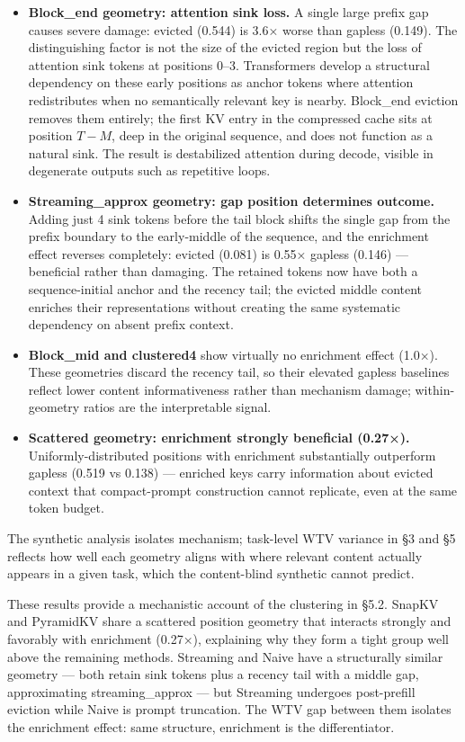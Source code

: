 \documentclass[10pt,letterpaper]{article}
\providecommand{\tightlist}{%
  \setlength{\itemsep}{0pt}\setlength{\parskip}{0pt}}
\begin{document}
\begin{itemize}
\tightlist
\item
  \textbf{Block\_end geometry: attention sink loss.} A single large
  prefix gap causes severe damage: evicted (0.544) is 3.6× worse than
  gapless (0.149). The distinguishing factor is not the size of the
  evicted region but the loss of attention sink tokens at positions 0--3.
  Transformers develop a structural dependency on these early positions
  as anchor tokens where attention redistributes when no semantically
  relevant key is nearby. Block\_end eviction removes them entirely; the
  first KV entry in the compressed cache sits at position $T{-}M$, deep
  in the original sequence, and does not function as a natural sink. The
  result is destabilized attention during decode, visible in degenerate
  outputs such as repetitive loops.
\item
  \textbf{Streaming\_approx geometry: gap position determines outcome.}
  Adding just 4 sink tokens before the tail block shifts the single gap
  from the prefix boundary to the early-middle of the sequence, and the
  enrichment effect reverses completely: evicted (0.081) is 0.55× gapless
  (0.146) --- beneficial rather than damaging. The retained tokens now
  have both a sequence-initial anchor and the recency tail; the evicted
  middle content enriches their representations without creating the same
  systematic dependency on absent prefix context.
\item
  \textbf{Block\_mid and clustered4} show virtually no enrichment
  effect (1.0×). These geometries discard the recency tail, so their
  elevated gapless baselines reflect lower content informativeness rather
  than mechanism damage; within-geometry ratios are the interpretable
  signal.
\item
  \textbf{Scattered geometry: enrichment strongly beneficial (0.27×).}
  Uniformly-distributed positions with enrichment substantially
  outperform gapless (0.519 vs 0.138) --- enriched keys carry
  information about evicted context that compact-prompt construction
  cannot replicate, even at the same token budget.
\end{itemize}

The synthetic analysis isolates mechanism; task-level WTV variance in §3 and §5
reflects how well each geometry aligns with where relevant content actually
appears in a given task, which the content-blind synthetic cannot predict.

These results provide a mechanistic account of the clustering in §5.2.
SnapKV and PyramidKV share a scattered position geometry that
interacts strongly and favorably with enrichment (0.27×), explaining
why they form a tight group well above the remaining methods. Streaming
and Naive have a structurally similar geometry --- both retain sink
tokens plus a recency tail with a middle gap, approximating
streaming\_approx --- but Streaming undergoes post-prefill eviction
while Naive is prompt truncation. The WTV gap between them isolates the
enrichment effect: same structure, enrichment is the differentiator.
\end{document}
